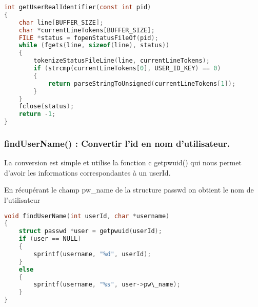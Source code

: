 \begin{lstlisting}[frame=single, language=c]
int getUserRealIdentifier(const int pid)
{
    char line[BUFFER_SIZE];
    char *currentLineTokens[BUFFER_SIZE];
    FILE *status = fopenStatusFileOf(pid);
    while (fgets(line, sizeof(line), status))
    {
        tokenizeStatusFileLine(line, currentLineTokens);
        if (strcmp(currentLineTokens[0], USER_ID_KEY) == 0)
        {
            return parseStringToUnsigned(currentLineTokens[1]);
        }
    }
    fclose(status);
    return -1;
}
\end{lstlisting}

\subsubsection{findUserName() : Convertir l'id en nom d'utilisateur.}
La conversion est simple et utilise la fonction c getpwuid() qui nous permet d'avoir les informations correspondantes à un userId.

En récupérant le champ pw_name de la structure passwd on obtient le nom de l'utilisateur

\begin{lstlisting}[frame=single, language=c]
void findUserName(int userId, char *username)
{
    struct passwd *user = getpwuid(userId);
    if (user == NULL)
    {
        sprintf(username, "%d", userId);
    }
    else
    {
        sprintf(username, "%s", user->pw\_name);
    }
}
\end{lstlisting}



